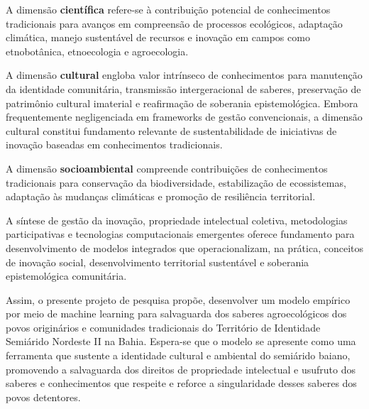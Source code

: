 A dimensão \textbf{científica} refere-se à contribuição potencial de conhecimentos tradicionais para avanços em compreensão de processos ecológicos, adaptação climática, manejo sustentável de recursos e inovação em campos como etnobotânica, etnoecologia e agroecologia.

A dimensão \textbf{cultural} engloba valor intrínseco de conhecimentos para manutenção da identidade comunitária, transmissão intergeracional de saberes, preservação de patrimônio cultural imaterial e reafirmação de soberania epistemológica. Embora frequentemente negligenciada em frameworks de gestão convencionais, a dimensão cultural constitui fundamento relevante de sustentabilidade de iniciativas de inovação baseadas em conhecimentos tradicionais.

A dimensão \textbf{socioambiental} compreende contribuições de conhecimentos tradicionais para conservação da biodiversidade, estabilização de ecossistemas, adaptação às mudanças climáticas e promoção de resiliência territorial.

A síntese de gestão da inovação, propriedade intelectual coletiva, metodologias participativas e tecnologias computacionais emergentes oferece fundamento para desenvolvimento de modelos integrados que operacionalizam, na prática, conceitos de inovação social, desenvolvimento territorial sustentável e soberania epistemológica comunitária.

Assim, o presente projeto de pesquisa propõe, desenvolver um modelo empírico por meio de machine learning para salvaguarda dos saberes agroecológicos dos povos originários e comunidades tradicionais do Território de Identidade Semiárido Nordeste II na Bahia. Espera-se que o modelo se apresente como uma ferramenta que sustente a identidade cultural e ambiental do semiárido baiano, promovendo a salvaguarda dos direitos de propriedade intelectual e usufruto dos saberes e conhecimentos que respeite e reforce a singularidade desses saberes dos povos detentores.


